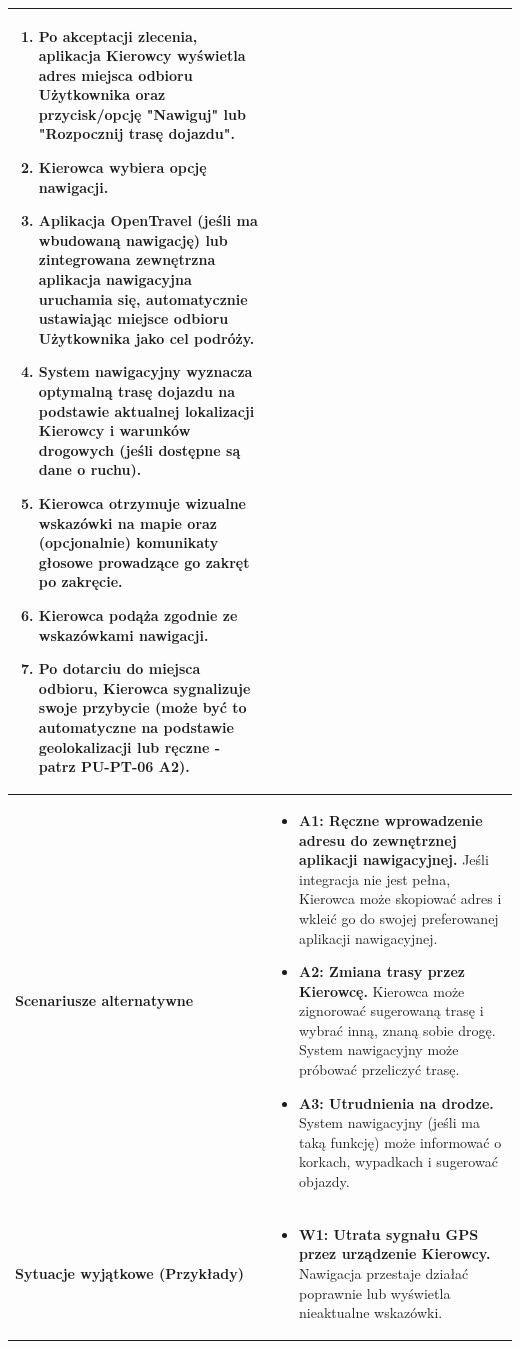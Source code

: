 \documentclass[a4paper,12pt]{article}
\begin{document}
\begin{longtable}{|p{\pierwszakolumnaszerokoscPUTPTNawigacjaDo}|p{\drugakolumnaszerokoscPUTPTNawigacjaDo}|}
        \begin{enumerate} \itemsep0pt \parskip0pt \parsep0pt
            \item Po akceptacji zlecenia, aplikacja Kierowcy wyświetla adres miejsca odbioru Użytkownika oraz przycisk/opcję "Nawiguj" lub "Rozpocznij trasę dojazdu".
            \item Kierowca wybiera opcję nawigacji.
            \item Aplikacja OpenTravel (jeśli ma wbudowaną nawigację) lub zintegrowana zewnętrzna aplikacja nawigacyjna uruchamia się, automatycznie ustawiając miejsce odbioru Użytkownika jako cel podróży.
            \item System nawigacyjny wyznacza optymalną trasę dojazdu na podstawie aktualnej lokalizacji Kierowcy i warunków drogowych (jeśli dostępne są dane o ruchu).
            \item Kierowca otrzymuje wizualne wskazówki na mapie oraz (opcjonalnie) komunikaty głosowe prowadzące go zakręt po zakręcie.
            \item Kierowca podąża zgodnie ze wskazówkami nawigacji.
            \item Po dotarciu do miejsca odbioru, Kierowca sygnalizuje swoje przybycie (może być to automatyczne na podstawie geolokalizacji lub ręczne - patrz PU-PT-06 A2).
        \end{enumerate} \\
    \hline
    \textbf{Scenariusze alternatywne} &
        \begin{itemize} \itemsep0pt \parskip0pt \parsep0pt
            \item \textbf{A1: Ręczne wprowadzenie adresu do zewnętrznej aplikacji nawigacyjnej.} Jeśli integracja nie jest pełna, Kierowca może skopiować adres i wkleić go do swojej preferowanej aplikacji nawigacyjnej.
            \item \textbf{A2: Zmiana trasy przez Kierowcę.} Kierowca może zignorować sugerowaną trasę i wybrać inną, znaną sobie drogę. System nawigacyjny może próbować przeliczyć trasę.
            \item \textbf{A3: Utrudnienia na drodze.} System nawigacyjny (jeśli ma taką funkcję) może informować o korkach, wypadkach i sugerować objazdy.
        \end{itemize} \\
    \hline
    \textbf{Sytuacje wyjątkowe (Przykłady)} &
        \begin{itemize} \itemsep0pt \parskip0pt \parsep0pt
            \item \textbf{W1: Utrata sygnału GPS przez urządzenie Kierowcy.} Nawigacja przestaje działać poprawnie lub wyświetla nieaktualne wskazówki.

\end{itemize}
\end{longtable}
\end{document}
